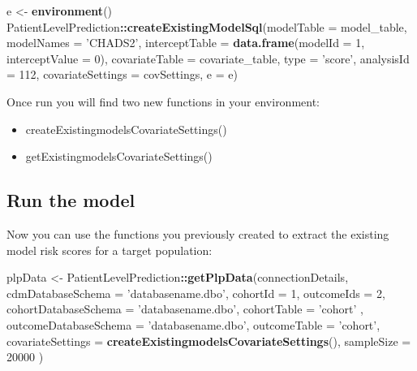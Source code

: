 \documentclass[]{article}
\newenvironment{Shaded}{\begin{snugshade}}{\end{snugshade}}
\newcommand{\KeywordTok}[1]{\textcolor[rgb]{0.13,0.29,0.53}{\textbf{#1}}}
\newcommand{\DataTypeTok}[1]{\textcolor[rgb]{0.13,0.29,0.53}{#1}}
\newcommand{\DecValTok}[1]{\textcolor[rgb]{0.00,0.00,0.81}{#1}}
\newcommand{\StringTok}[1]{\textcolor[rgb]{0.31,0.60,0.02}{#1}}
\newcommand{\OperatorTok}[1]{\textcolor[rgb]{0.81,0.36,0.00}{\textbf{#1}}}
\newcommand{\NormalTok}[1]{#1}
\providecommand{\tightlist}{%
  \setlength{\itemsep}{0pt}\setlength{\parskip}{0pt}}
\begin{document}
\begin{Shaded}
\begin{Highlighting}[]
\NormalTok{e <-}\StringTok{ }\KeywordTok{environment}\NormalTok{()}
\NormalTok{PatientLevelPrediction}\OperatorTok{::}\KeywordTok{createExistingModelSql}\NormalTok{(}\DataTypeTok{modelTable =}\NormalTok{ model_table, }
                       \DataTypeTok{modelNames =} \StringTok{'CHADS2'}\NormalTok{, }
                       \DataTypeTok{interceptTable =} \KeywordTok{data.frame}\NormalTok{(}\DataTypeTok{modelId =} \DecValTok{1}\NormalTok{, }\DataTypeTok{interceptValue =} \DecValTok{0}\NormalTok{),}
                       \DataTypeTok{covariateTable =}\NormalTok{ covariate_table, }
                       \DataTypeTok{type =} \StringTok{'score'}\NormalTok{,}
                       \DataTypeTok{analysisId =} \DecValTok{112}\NormalTok{, }\DataTypeTok{covariateSettings =}\NormalTok{ covSettings, }\DataTypeTok{e =}\NormalTok{ e)}
\end{Highlighting}
\end{Shaded}

Once run you will find two new functions in your environment:

\begin{itemize}
\tightlist
\item
  createExistingmodelsCovariateSettings()
\item
  getExistingmodelsCovariateSettings()
\end{itemize}

\subsection{Run the model}\label{run-the-model}

Now you can use the functions you previously created to extract the
existing model risk scores for a target population:

\begin{Shaded}
\begin{Highlighting}[]
\NormalTok{plpData <-}\StringTok{ }\NormalTok{PatientLevelPrediction}\OperatorTok{::}\KeywordTok{getPlpData}\NormalTok{(connectionDetails, }
                      \DataTypeTok{cdmDatabaseSchema =} \StringTok{'databasename.dbo'}\NormalTok{,}
                      \DataTypeTok{cohortId =} \DecValTok{1}\NormalTok{,}
                      \DataTypeTok{outcomeIds =} \DecValTok{2}\NormalTok{, }
                      \DataTypeTok{cohortDatabaseSchema =} \StringTok{'databasename.dbo'}\NormalTok{, }
                      \DataTypeTok{cohortTable =}  \StringTok{'cohort'}\NormalTok{ , }
                      \DataTypeTok{outcomeDatabaseSchema =} \StringTok{'databasename.dbo'}\NormalTok{, }
                      \DataTypeTok{outcomeTable =} \StringTok{'cohort'}\NormalTok{, }
                      \DataTypeTok{covariateSettings =}  \KeywordTok{createExistingmodelsCovariateSettings}\NormalTok{(),}
                      \DataTypeTok{sampleSize =} \DecValTok{20000}
\NormalTok{                      )}
\end{Highlighting}
\end{Shaded}
\end{document}
